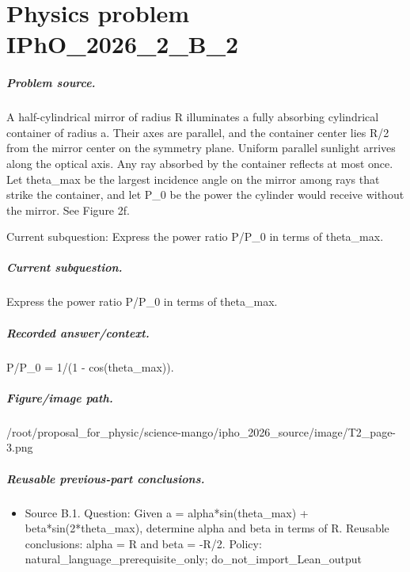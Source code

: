 
\chapter{Physics problem IPhO\_2026\_2\_B\_2}
\label{ch:IPhO2026Problems_problem_IPhO_2026_2_B_2}

\paragraph{Problem source.}
A half-cylindrical mirror of radius R illuminates a fully absorbing cylindrical
container of radius a.  Their axes are parallel, and the container center lies
R/2 from the mirror center on the symmetry plane.  Uniform parallel sunlight
arrives along the optical axis.  Any ray absorbed by the container reflects at
most once.  Let theta\_max be the largest incidence angle on the mirror among
rays that strike the container, and let P\_0 be the power the cylinder would
receive without the mirror.  See Figure 2f.

Current subquestion:
Express the power ratio P/P\_0 in terms of theta\_max.

\paragraph{Current subquestion.}
Express the power ratio P/P\_0 in terms of theta\_max.

\paragraph{Recorded answer/context.}
P/P\_0 = 1/(1 - cos(theta\_max)).

\paragraph{Figure/image path.}
/root/proposal\_for\_physic/science-mango/ipho\_2026\_source/image/T2\_page-3.png

\paragraph{Reusable previous-part conclusions.}
\begin{itemize}
\item Source B.1. Question: Given a = alpha*sin(theta\_max) + beta*sin(2*theta\_max), determine alpha and beta in terms of R. Reusable conclusions: alpha = R and beta = -R/2. Policy: natural\_language\_prerequisite\_only; do\_not\_import\_Lean\_output
\end{itemize}

